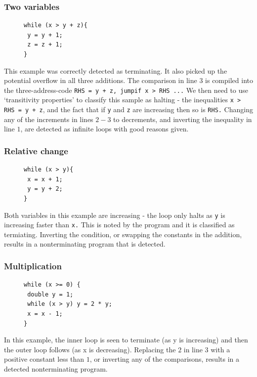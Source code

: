 \documentclass[12pt,a4paper]{article}
\begin{document}
\subsubsection{Two variables \cite[A.6]{tra}}

\begin{figure}
\centering
\begin{lstlisting}[frame=tlrb,language=myLang]
while (x > y + z){
 y = y + 1;
 z = z + 1;
}
\end{lstlisting}
\end{figure}
This example was correctly detected as terminating. It also picked up the potential overflow in all three additions.
The comparison in line $3$ is compiled into the three-address-code \texttt{RHS = y + z, jumpif x > RHS ...}
We then need to use `transitivity properties' to classify this sample as halting - the inequalities \texttt{x > RHS = y + z},
and the fact that if \texttt{y} and \texttt{z} are increasing then so is \texttt{RHS.}
Changing any of the increments in lines $2-3$ to decrements, and inverting the inequality in line $1$, are detected as infinite loops with good reasons given.

\subsubsection{Relative change \cite[A.8]{tra}}

\begin{figure}
\centering
\begin{lstlisting}[frame=tlrb,language=myLang]
while (x > y){
 x = x + 1;
 y = y + 2;
}
\end{lstlisting}
\end{figure}
Both variables in this example are increasing - the loop only halts as \texttt{y} is increasing faster than \texttt{x.}
This is noted by the program and it is classified as termiating. Inverting the condition, or swapping the constants in the addition,
results in a nonterminating program that is detected.

\pagebreak
\subsubsection{Multiplication \cite[C.1]{tra}} \label{mult}

\begin{figure}
\centering
\begin{lstlisting}[frame=tlrb,language=myLang]
while (x >= 0) {
 double y = 1;
 while (x > y) y = 2 * y;
 x = x - 1;
}
\end{lstlisting}
\end{figure}
In this example, the inner loop is seen to terminate (as y is increasing) and then the outer loop follows (as x is decreasing).
Replacing the $2$ in line $3$ with a positive constant less than $1$, or inverting any of the comparisons, results in a detected nonterminating program.
\end{document}
